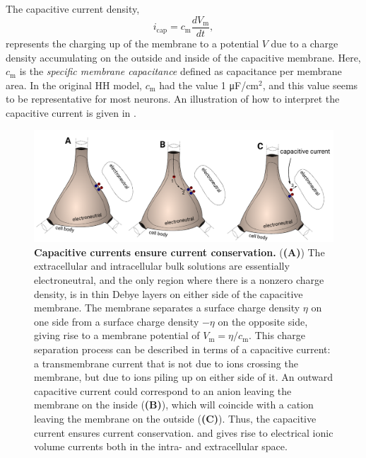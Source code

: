 \subsection{}
\label{sec:Neuron:Cap}
The capacitive current density,
\begin{equation}
i_{\mathrm{cap}}= c_{\mathrm{m}} \frac{dV_\mathrm{m}}{dt},
\label{eq:Neuron:HHcap}
\end{equation}
represents the charging up of the membrane to a potential $V$ due to a charge density accumulating on the outside and inside of the capacitive membrane. Here, $c_{\mathrm{m}}$ is the \textit{specific membrane capacitance} defined as capacitance per membrane area. In the original HH model, $c_{\mathrm{m}}$ had the value 1 \si{\micro \farad / \cm}$^2$, and this value seems to be representative for most neurons.  An illustration of how to interpret the capacitive current is given in . 

\begin{figure}[!ht]
\begin{center}
\includegraphics[width=1.0\textwidth]{Figures/Neuron/capacitive_currents.pdf}
\end{center}
\caption{\textbf{Capacitive currents ensure current conservation.} (\textbf{(A)}) The extracellular and intracellular bulk solutions are essentially electroneutral, and the only region where there is a nonzero charge density, is in thin Debye layers on either side of the capacitive membrane. The membrane separates a surface charge density $\eta$ on one side from a surface charge density $-\eta$ on the opposite side, giving rise to a membrane potential of $V_\mathrm{m} = \eta/c_{\mathrm{m}}$. This charge separation process can be described in terms of a capacitive current: a transmembrane current that is not due to ions crossing the membrane, but due to ions piling up on either side of it.  An outward capacitive current could correspond to an anion leaving the membrane on the inside (\textbf{(B)}), which will coincide with a cation leaving the membrane on the outside (\textbf{(C)}). Thus, the capacitive current ensures current conservation. and gives rise to electrical ionic volume currents both in the intra- and extracellular space.
}
\label{fig:Neuron:capacitive_currents}
\end{figure}

